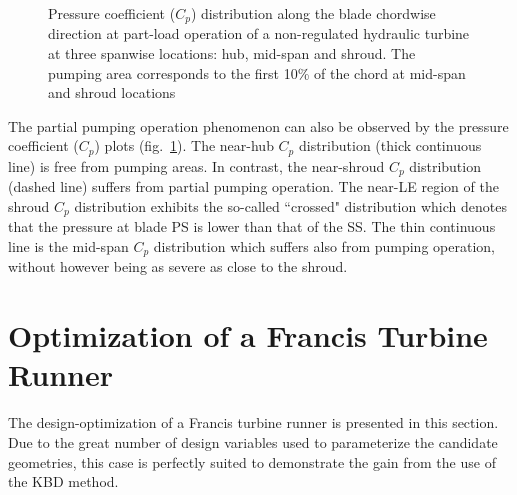 \begin{figure}[h!]
\begin{minipage}[b]{1\linewidth}
 \centering
\end{minipage}
\caption{Pressure coefficient ($C_p$) distribution along the blade chordwise direction at part-load operation of a non-regulated hydraulic turbine at three spanwise locations: hub, mid-span and shroud. The pumping area corresponds to the first 10\% of the chord at mid-span and shroud locations}
\label{design-pumpS2}
\end{figure}

The partial pumping operation phenomenon can also be observed by the pressure coefficient ($C_p$) plots (fig.\ \ref{design-pumpS2}). The near-hub $C_p$ distribution (thick continuous line) is free from pumping areas. In contrast,  the near-shroud $C_p$ distribution (dashed line) suffers from partial pumping operation. The near-LE region of the shroud $C_p$ distribution exhibits the so-called ``crossed" distribution which denotes that the pressure at blade PS is lower than that of the SS. The thin continuous line is the mid-span $C_p$ distribution which suffers also from pumping operation, without however being as severe as close to the shroud.        
\FloatBarrier

\section{Optimization of a Francis Turbine Runner} %
The design-optimization of a Francis turbine runner is presented in this section. Due to the great number of design variables used to parameterize the candidate geometries, this case is perfectly suited to demonstrate the gain from the use  of the KBD method. 
\label{Francis-runners}
